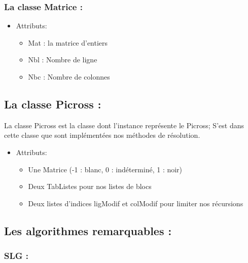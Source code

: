 \documentclass{article}
\begin{document}
\subsubsection{La classe Matrice :}
\begin{itemize}
\item Attributs:
\begin{itemize}
\item Mat : la matrice d'entiers
\item Nbl : Nombre de ligne
\item Nbc : Nombre de colonnes
\end{itemize}
\end{itemize}
\subsection{ La classe Picross :}
La classe Picross est la classe dont l'instance représente le Picross; S'est dans cette classe que sont implémentées nos méthodes de résolution.
\begin{itemize}
\item Attributs:
\begin{itemize}
\item Une Matrice (-1 : blanc, 0 : indéterminé, 1 : noir)
\item Deux TabListes pour nos listes de blocs
\item Deux listes d'indices ligModif et colModif pour limiter nos récursions
\end{itemize}
\end{itemize}
\subsection{Les algorithmes remarquables :}
\subsubsection{SLG :}
\end{document}
